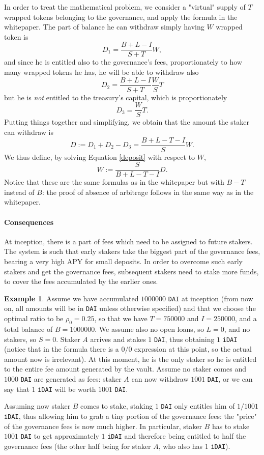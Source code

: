 \documentclass[a4paper,10 pt]{article}
\theoremstyle{definition}
\newtheorem{example}{Example}
\begin{document}
In order to treat the mathematical problem, we consider a "virtual" supply of $T$ wrapped tokens belonging to the governance, and apply the formula in the whitepaper. The part of balance he can withdraw simply having $W$ wrapped token is $$D_1 = \frac{B + L - I}{S + T}W,$$ and since he is entitled also to the governance's fees, proportionately to how many wrapped tokens he has, he will be able to withdraw also $$D_2 =  \frac{B + L - I}{S + T}\frac{W}{S}T $$ but he is {\it not} entitled to the treasury's capital, which is proportionately $$D_3 = \frac{W}{S}T.$$ Putting things together and simplifying, we obtain that the amount the staker can withdraw is
\begin{equation}\label{deposit}D := D_1 + D_2 - D_3 = \frac{B+L-T-I}{S}W.\end{equation}
We thus define, by solving Equation \eqref{deposit} with respect to $W$,
\begin{equation}\label{wrappedTokens}W := \frac{S}{B+L-T-I}D.\end{equation}
Notice that these are the same formulas as in the whitepaper but with $B-T$ instead of $B$: the proof of absence of arbitrage follows in the same way as in the whitepaper.

\paragraph{Consequences}
At inception, there is a part of fees which need to be assigned to future stakers. The system is such that early stakers take the biggest part of the governance fees, bearing a very high APY for small deposits. In order to overcome such early stakers and get the governance fees, subsequent stakers need to stake more funds, to cover the fees accumulated by the earlier ones.

\begin{example}
Assume we have accumulated $1000000$ \verb|DAI| at inception (from now on, all amounts will be in \verb|DAI| unless otherwise specified) and that we choose the optimal ratio to be $\rho_0 = 0.25$, so that we have $T = 750000$ and $I = 250000$, and a total balance of $B = 1000000$. We assume also no open loans, so $L = 0$, and no stakers, so $S = 0$.
Staker $A$ arrives and stakes $1$ \verb|DAI|, thus obtaining $1$ \verb|iDAI| (notice that in the formula there is a $0/0$ expression at this point, so the actual amount now is irrelevant). At this moment, he is the only staker so he is entitled to the entire fee amount generated by the vault. Assume no staker comes and $1000$ \verb|DAI| are generated as fees: staker $A$ can now withdraw $1001$ \verb|DAI|, or we can say that $1$ \verb|iDAI| will be worth $1001$ \verb|DAI|.

Assuming now staker $B$ comes to stake, staking $1$ \verb|DAI| only entitles him of $1/1001$ \verb|iDAI|, thus allowing him to grab a tiny portion of the governance fees: the "price" of the governance fees is now much higher. In particular, staker $B$ has to stake $1001$ \verb|DAI| to get approximately $1$ \verb|iDAI| and therefore being entitled to half the governance fees (the other half being for staker $A$, who also has $1$ \verb|iDAI|).
\end{example}
\end{document}
